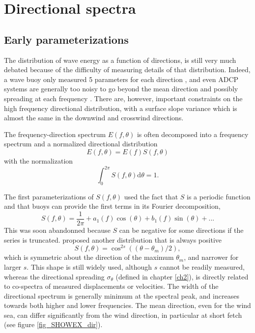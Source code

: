 \section{Directional spectra} 
\subsection{Early parameterizations}
The distribution of wave energy as a function of directions, is still very much debated because of the 
difficulty of measuring details of that distribution. Indeed, a wave buoy only measured 5 parameters for each direction \citep[e.g.][]{Kuik&al.1988}, and even 
ADCP systems are generally too noisy to go beyond the mean direction and possibly spreading at each frequency \citep{Herbers&Lentz2010}. 
There are, however, important constraints on the high frequency directional distribution, with a surface slope variance which is almost the same in the downwind and 
crosswind directions. 

The frequency-direction spectrum $E(f,\theta)$ is often decomposed into a frequency spectrum and a 
normalized directional distribution 
\begin{equation}
   E(f,\theta)=E(f)S(f,\theta)
\end{equation}
with the normalization
\begin{equation}
   \int_0^{2\pi} S(f,\theta) {\mathrm d}\theta=1.
\end{equation}

The first parameterizations of $S(f,\theta)$ used the fact that $S$ is a periodic function 
and that buoys can provide the first terms in its Fourier decomposition, 
\begin{equation}
S(f,\theta)=\frac{1}{2\pi} + a_1(f) \cos(\theta) + b_1(f) \sin(\theta) + ... 
\end{equation}
This was soon abandonned because $S$ can be negative for some directions if the series is truncated. \cite{Longuet-Higgins&al.1963} proposed 
another distribution that is always positive  
\begin{equation}
   S(f,\theta)=\cos^{2s}\left((\theta-\theta_m)/2\right),
\end{equation}
which is symmetric about the direction of the maximum $\theta_m$, and narrower for larger $s$. This shape is still widely used, 
although $s$ cannot be readily measured, whereas the directional spreading  $\sigma_\theta$ (defined in 
chapter \ref{ch2}), is directly related to co-spectra of measured displacements or velocities. 
The width of the directional spectrum is generally minimum at the spectral peak, and increases towards both higher 
and lower frequencies.  The mean direction, even for the wind sea, can differ significantly from the wind direction, 
in particular at short fetch (see figure
\ref{fig_SHOWEX_dir}).


